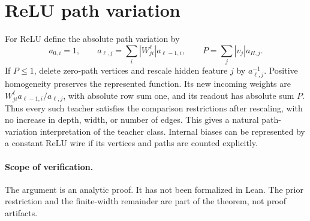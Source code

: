 \documentclass[11pt]{article}
\begin{document}
\section{ReLU path variation}
For ReLU define the absolute path variation by
\[
 a_{0,i}=1,\qquad a_{\ell,j}=\sum_i|W^\ell_{ji}|a_{\ell-1,i},
 \qquad P=\sum_j|v_j|a_{H,j}.
\]
If $P\le1$, delete zero-path vertices and rescale hidden feature $j$ by $a_{\ell,j}^{-1}$. Positive homogeneity preserves the represented function. Its new incoming weights are
$W^\ell_{ji}a_{\ell-1,i}/a_{\ell,j}$, with absolute row sum one, and its readout has absolute sum $P$. Thus every such teacher satisfies the comparison restrictions after rescaling, with no increase in depth, width, or number of edges. This gives a natural path-variation interpretation of the teacher class. Internal biases can be represented by a constant ReLU wire if its vertices and paths are counted explicitly.

\paragraph{Scope of verification.}
The argument is an analytic proof. It has not been formalized in Lean. The prior restriction and the finite-width remainder are part of the theorem, not proof artifacts.
\end{document}
